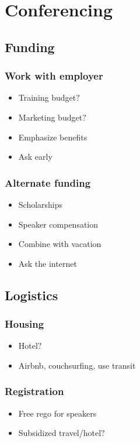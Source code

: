 \documentclass{beamer}
\begin{document}
\section{Conferencing}

\begin{frame}[fragile]
\tableofcontents[currentsection]
\end{frame}


\subsection{Funding}
\begin{frame}[fragile]
\frametitle{Work with employer }
\begin{itemize}[<+(1)->]
\item Training budget$?$
\item Marketing budget$?$
\item Emphasize benefits
\item Ask early
\end{itemize}
\end{frame}

\begin{frame}[fragile]
\frametitle{Alternate funding}
\begin{itemize}[<+(1)->]
\item Scholarships
\item Speaker compensation
\item Combine with vacation
\item Ask the internet
\end{itemize}
\end{frame}

\subsection{Logistics}
\begin{frame}[fragile]
\frametitle{Housing}
\begin{itemize}[<+(1)->]
\item Hotel$?$
\item Airbnb, couchsurfing, use transit
\end{itemize}
\end{frame}

\begin{frame}[fragile]
\frametitle{Registration}
\begin{itemize}[<+(1)->]
\item Free rego for speakers
\item Subsidized travel/hotel$?$
\end{itemize}
\end{frame}
\end{document}
